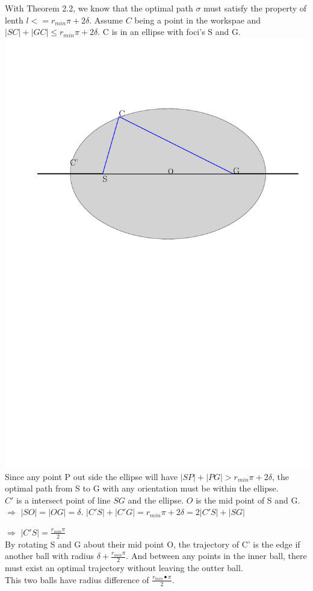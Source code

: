 \documentclass[12pt]{article}
\begin{document}
  With Theorem 2.2, we know that the optimal path $\sigma$ must satisfy the property of lenth $l <= r_{min}\pi + 2\delta$. Assume $C$ being a point in the workspae and $|SC|+|GC| \leq r_{min}\pi + 2\delta$. C is in an ellipse with foci's S and G. \\ 
  
  \includegraphics[scale=0.7]{Ellipse}\\
  
  Since any point P out side the ellipse will have $|SP| + |PG| > r_{min}\pi + 2\delta$, the optimal path from S to G with any orientation must be within the ellipse.\\
  
  $C'$ is a intersect point of line $SG$ and the ellipse. $O$ is the mid point of S and G. \\
  
  $\Longrightarrow$ $|SO| = |OG| = \delta$. $|C'S| + |C'G| = r_{min}\pi + 2\delta = 2|C'S| + |SG|$
  
  $\Longrightarrow$ $|C'S| = \frac{r_{min}\pi}{2}$\\
  
  By rotating S and G about their mid point O, the trajectory of C' is the edge if another ball with radius $\delta + \frac{r_{min}\pi}{2}$. And between any points in the inner ball, there must exist an optimal trajectory without leaving the outter ball. \\
  
  This two balls have radius difference of $\frac{r_{min}•\pi}{2}$.
  
\end{document}
